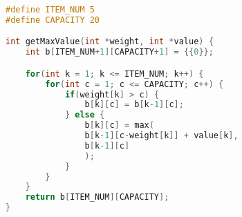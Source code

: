 
\begin{lstlisting}[language=C]
#define ITEM_NUM 5
#define CAPACITY 20

int getMaxValue(int *weight, int *value) {
    int b[ITEM_NUM+1][CAPACITY+1] = {{0}};

    for(int k = 1; k <= ITEM_NUM; k++) {
        for(int c = 1; c <= CAPACITY; c++) {
            if(weight[k] > c) {
                b[k][c] = b[k-1][c];
            } else {
                b[k][c] = max(
                b[k-1][c-weight[k]] + value[k],
                b[k-1][c]
                );
            }
        }
    }
    return b[ITEM_NUM][CAPACITY];
}
\end{lstlisting}

\newpage